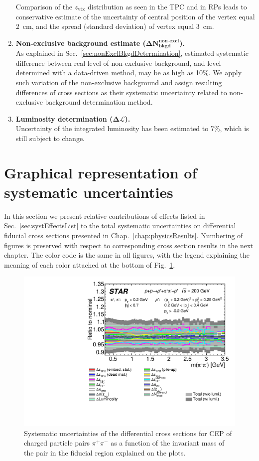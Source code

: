 \begin{enumerate}
 Comparison of the $z_{\text{vtx}}$ distribution as seen in the TPC and in RPs leads to conservative estimate of the uncertainty of central position of the vertex equal 2~cm, and the spread (standard deviation) of vertex equal 3~cm.
 \item \textbf{Non-exclusive background estimate ($\bm{\Delta N_{\text{bkgd}}^{\text{non-excl}}}$).}\\
 As explained in Sec.~\ref{sec:nonExclBkgdDetermination}, estimated systematic difference between real level of non-exclusive background, and level determined with a data-driven method, may be as high as 10\%. We apply such variation of the non-exclusive background and assign resulting differences of cross sections as their systematic uncertainty related to non-exclusive background determination method.
 \item \textbf{Luminosity determination ($\bm{\Delta\mathcal{L}}$).}\\
 Uncertainty of the integrated luminosity has been estimated to 7\%, which is still subject to change.
\end{enumerate}

\section{Graphical representation of systematic uncertainties}
In this section we present relative contributions of effects listed in Sec.~\ref{sec:systEffectsList} to the total systematic uncertainties on differential fiducial cross sections presented in Chap.~\ref{chap:physicsResults}. Numbering of figures is preserved with respect to corresponding cross section results in the next chapter. The color code is the same in all figures, with the legend explaining the meaning of each color attached at the bottom of Fig.~\ref{systematics_01}.


\begin{figure}[h]
\centering
\includegraphics[width=.9\textwidth,page=1]{graphics/systematics/FinalResult_InvMass_pion_Systematics.pdf}
%
\caption{Systematic uncertainties of the differential cross sections for CEP of charged particle pairs $\pi^+\pi^-$ as a function of the invariant mass of the pair in the fiducial region explained on the plots.}
\label{systematics_01}
\end{figure}

